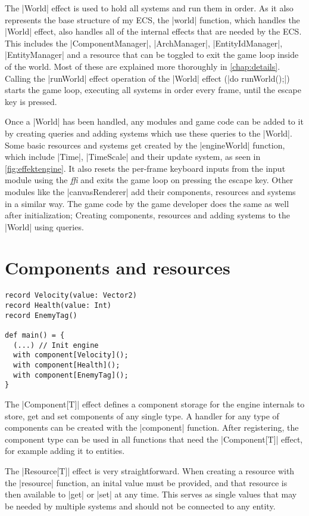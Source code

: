 The |World| effect is used to hold all systems and run them in order. As it also represents the base structure of my ECS, the |world| function, which handles the |World| effect, also handles all of the internal effects that are needed by the ECS. This includes the |ComponentManager|, |ArchManager|, |EntityIdManager|, |EntityManager| and a resource that can be toggled to exit the game loop inside of the world. Most of these are explained more thoroughly in \cref{chap:details}. Calling the |runWorld| effect operation of the |World| effect (|do runWorld();|) starts the game loop, executing all systems in order every frame, until the escape key is pressed.

Once a |World| has been handled, any modules and game code can be added to it by creating queries and adding systems which use these queries to the |World|. Some basic resources and systems get created by the |engineWorld| function, which include |Time|, |TimeScale| and their update system, as seen in \cref{fig:effektengine}. It also resets the per-frame keyboard inputs from the input module using the \textit{ffi} and exits the game loop on pressing the escape key. Other modules like the |canvasRenderer| add their components, resources and systems in a similar way. The game code by the game developer does the same as well after initialization; Creating components, resources and adding systems to the |World| using queries.

\section{Components and resources}

\begin{lstlisting}[caption=Register components example]
record Velocity(value: Vector2)
record Health(value: Int)
record EnemyTag()

def main() = {
  (...) // Init engine
  with component[Velocity]();
  with component[Health]();
  with component[EnemyTag]();
}
\end{lstlisting}

The |Component[T]| effect defines a component storage for the engine internals to store, get and set components of any single type. A handler for any type of components can be created with the |component| function. After registering, the component type can be used in all functions that need the |Component[T]| effect, for example adding it to entities.

The |Resource[T]| effect is very straightforward. When creating a resource with the |resource| function, an inital value must be provided, and that resource is then available to |get| or |set| at any time. This serves as single values that may be needed by multiple systems and should not be connected to any entity.

